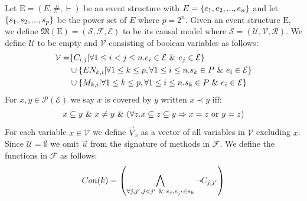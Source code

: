 Let $\mathrm{E} = (E,\#,\vdash)$ be an event structure with
$E = \{e_1, e_2, ...,e_n\}$ and let $\{s_1,s_2,...,s_p\}$ be the power set of $E$ where $p = 2^n$.
Given an event structure $\mathrm{E}$, we define
$\mathfrak{M}(\mathrm{E}) = (\mathcal{S},\mathcal{F},\mathcal{E})$
to be its causal model where
$\mathcal{S} = (\mathcal{U},\mathcal{V},\mathcal{R})$.
We define $\mathcal{U}$ to be empty and $\mathcal{V}$ consisting
of boolean variables as follows:
\begin{align*}
    \mathcal{V} = & \{C_{i,j} | \forall 1 \leq i < j \leq n. e_i \in \mathcal{E} \ \& \  e_j \in \mathcal{E}\}                     \\
                  & \cup \{EN_{k,i} | \forall 1 \leq k \leq p , \forall 1 \leq i \leq n . s_k \in P \ \& \  e_i \in \mathcal{E} \} \\
                  & \cup \{M_{k,i} | \forall 1 \leq k \leq p , \forall 1 \leq i \leq n . s_k \in P \ \& \  e_i \in \mathcal{E} \}
\end{align*}
For $x,y \in \mathcal{P}(\mathcal{E})$ we say $x$ is covered by $y$ written $ x \prec y$ iff:
\begin{align*}
    x \subseteq y \ \& \  x \neq y \ \& \ 
    (\forall z. x \subseteq z \subseteq y \Rightarrow x = z
    \text{ or } y = z)
\end{align*}
For each variable $x \in \mathcal{V}$ we define $\vec V_x$ as a vector
of all variables in $\mathcal{V}$ excluding $x$.
Since $\mathcal{U} = \emptyset$ we omit $\vec u$ from the
signature of methods in $\mathcal{F}$.
We define the functions in $\mathcal{F}$ as follows:
\begin{align*}
    Con(k) & =   \left(
    \bigwedge_{\forall j,j'. j<j' \ \& \  e_j,e_{j'} \in s_k}
    \neg C_{j,j'}
    \right)             \\
\end{align*}
